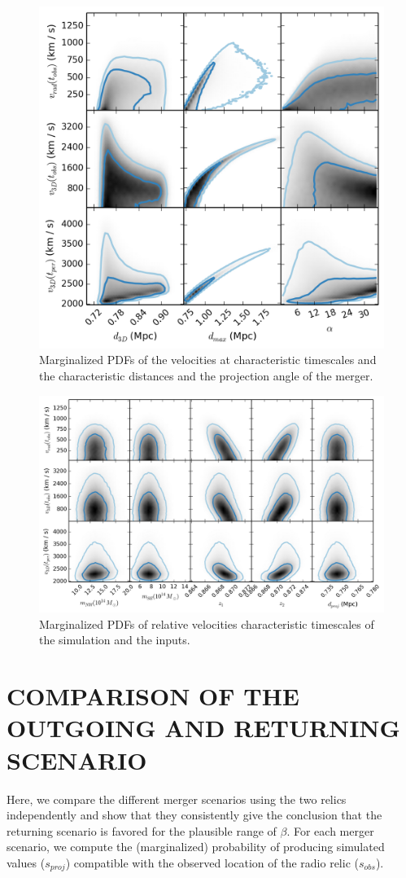 \documentclass[letterpaper,useAMS,usenatbib]{mn2e}
\begin{document}
\begin{figure}
\begin{minipage}{180mm}
	\begin{center}
	\includegraphics[width=0.5\linewidth]{TwoMnWBSG_velVSgeo.png}
	\caption{Marginalized PDFs of the velocities at characteristic timescales
		and the characteristic distances and the projection angle of the merger. }
	\end{center}
\end{minipage}
\end{figure}
\begin{figure}
\begin{minipage}{180mm}
	\begin{center}
	\includegraphics[width=0.7\linewidth]{TwoMnWBSG_velVSinputs.png}
	\caption{Marginalized PDFs of relative velocities characteristic
	timescales of the simulation and the inputs.}
	\end{center}
\end{minipage}
\end{figure}

\section{COMPARISON OF THE OUTGOING AND RETURNING SCENARIO}
\label{app:Bayes_factor}
%
Here, we compare the different merger scenarios using the two relics
independently and show that they consistently give the conclusion that the returning
scenario is favored for the plausible range of $\beta$. For each merger
scenario, we compute
the (marginalized) probability of producing simulated
values ($s_{proj}$) compatible with the observed location of the radio
relic ($s_{obs}$). 
\end{document}
